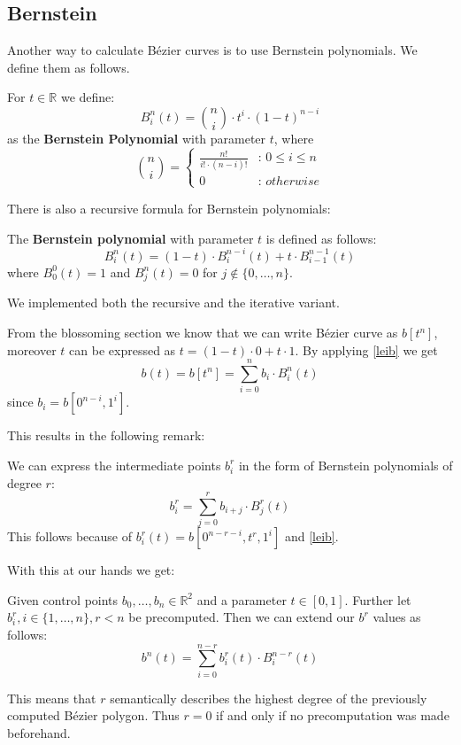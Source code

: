 \subsection{Bernstein}
Another way to calculate Bézier curves is to use Bernstein polynomials.
We define them as follows.
\begin{definition}
For $t \in \mathbb{R}$ we define:
\[B_i^n(t) = \binom{n}{i} \cdot t^{i} \cdot (1-t)^{n-i}\]
as the \textbf{Bernstein Polynomial} with parameter $t$, where
\[
\binom{n}{i} =
\left\{
	\begin{array}{ll}
		\frac{n!}{i! \cdot (n-i)!}  & \mbox{: } 0 \leq i \leq n \\
		 0 & \mbox{: } otherwise
	\end{array}
\right.\]
\end{definition}
There is also a recursive formula for Bernstein polynomials:
\begin{definition}
The \textbf{Bernstein polynomial} with parameter $t$ is defined as follows:
\[B_i^n(t) = (1-t) \cdot B_i^{n-i}(t) + t \cdot B_{i-1}^{n-1}(t)\]
where $B_0^0(t)=1$ and $B_j^n(t)=0$ for $j \notin \{0, \dots, n\}$.\\
\end{definition}
We implemented both the recursive and the iterative variant.
\begin{rem}
From the blossoming section we know that we can write Bézier curve as $b[t^n]$, moreover $t$ can be expressed as $t=(1-t) \cdot 0 + t \cdot 1$. By applying \cref{leib} we get
\[b(t) = b[t^n] = \sum_{i=0}^n b_i \cdot B_i^n(t)\]
since $b_i = b[0^{n-i}, 1^{i}]$.
\end{rem}
This results in the following remark:
\begin{rem}
We can express the intermediate points $b_i^r$ in the form of Bernstein polynomials of degree $r$:
\[b_i^r = \sum_{j=0}^r b_{i+j} \cdot B_j^r(t)\]
This follows because of $b_i^r(t) = b[0^{n-r-i}, t^r, 1^{i}]$ and \cref{leib}.
\end{rem}

With this at our hands we get:
\begin{theorem}
Given control points $b_0, \dots, b_n \in \mathbb{R}^2$ and a parameter $t \in [0,1]$. Further let $b_i^r, i \in \{1, \dots, n\}, r < n$ be precomputed. Then we can extend our $b^r$ values as follows:
\[b^n(t) = \sum_{i=0}^{n-r} b_i^r(t) \cdot B_i^{n-r}(t)\]
\end{theorem}

This means that $r$ semantically describes the highest degree of the previously computed Bézier polygon. Thus $r=0$ if and only if no precomputation was made beforehand.\\

